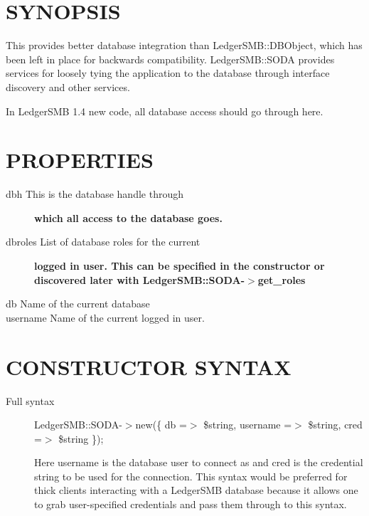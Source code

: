 \begin{description}
\begin{description}
\begin{description}
\begin{description}
\begin{description}
\begin{description}
\begin{description}
\begin{description}
\end{description}
\section{SYNOPSIS\label{SYNOPSIS}}


This provides better database integration than LedgerSMB::DBObject, which has
been left in place for backwards compatibility.  LedgerSMB::SODA provides
services for loosely tying the application to the database through interface
discovery and other services.



In LedgerSMB 1.4 new code, all database access should go through here.

\section{PROPERTIES\label{PROPERTIES}}
\begin{description}

\item[{dbh This is the database handle through}] \textbf{which all access to the database goes.}
\item[{dbroles List of database roles for the current}] \textbf{logged in user. This can be specified in the constructor or discovered later with LedgerSMB::SODA-$>$get\_roles}
\item[{db
Name of the current database}] \mbox{}
\item[{username Name of the current logged in user.}] \mbox{}\end{description}
\section{CONSTRUCTOR SYNTAX\label{CONSTRUCTOR_SYNTAX}}
\begin{description}

\item[{Full syntax}] \mbox{}

LedgerSMB::SODA-$>$new(\{ db =$>$ \$string, username =$>$ \$string, cred =$>$ \$string \});



Here username is the database user to connect as and cred is the credential
string to be used for the connection.  This syntax would be preferred for thick
clients interacting with a LedgerSMB database because it allows one to grab
user-specified credentials and pass them through to this syntax.



\end{description}
\end{description}
\end{description}
\end{description}
\end{description}
\end{description}
\end{description}
\end{description}
